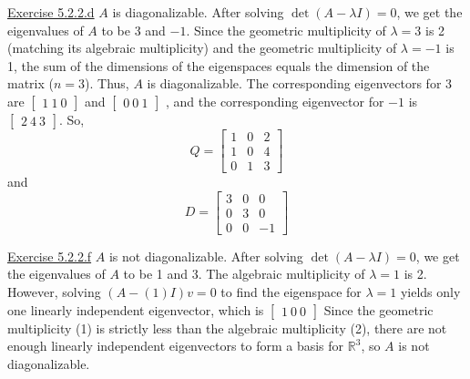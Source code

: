 \documentclass{exam}
\begin{document}
\underline{Exercise 5.2.2.d}
\newline
\newline
$A$ is diagonalizable. After solving $\det(A-\lambda I)=0$, we get the eigenvalues of $A$ to be 3 and $-1$. Since the geometric multiplicity of $\lambda=3$ is 2 (matching its algebraic multiplicity) and the geometric multiplicity of $\lambda=-1$ is 1, the sum of the dimensions of the eigenspaces equals the dimension of the matrix ($n=3$). Thus, $A$ is diagonalizable. The corresponding eigenvectors for 3 are
$
\begin{bmatrix}1 \
    1 \
    0
\end{bmatrix}
$ and
$
\begin{bmatrix}
    0 \
    0 \
    1
\end{bmatrix}$
, and the corresponding eigenvector for $-1$ is
$
\begin{bmatrix}2 \
    4 \
    3
\end{bmatrix}$. So,
\[Q=
\begin{bmatrix}
    1 & 0 & 2 \\
    1 & 0 & 4 \\
    0 & 1 & 3
\end{bmatrix}
\] and
\[
D=
\begin{bmatrix}
    3 & 0 & 0 \\
    0 & 3 & 0 \\
    0 & 0 & -1
\end{bmatrix}
\]
\newline

\underline{Exercise 5.2.2.f}
\newline
\newline$A$ is not diagonalizable. After solving $\det(A-\lambda I)=0$, we get the eigenvalues of $A$ to be 1 and 3. The algebraic multiplicity of $\lambda=1$ is 2. However, solving $(A-(1)I)v=0$ to find the eigenspace for $\lambda=1$ yields only one linearly independent eigenvector, which is
$
\begin{bmatrix}
    1 \
    0 \
    0
\end{bmatrix}
$
Since the geometric multiplicity (1) is strictly less than the algebraic multiplicity (2), there are not enough linearly independent eigenvectors to form a basis for $\mathbb{R}^3$, so $A$ is not diagonalizable.
\newline
\end{document}
